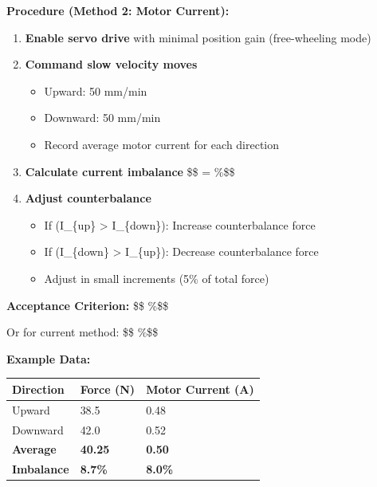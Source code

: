 \documentclass[
]{article}
\providecommand{\tightlist}{%
  \setlength{\itemsep}{0pt}\setlength{\parskip}{0pt}}
\begin{document}
\textbf{Procedure (Method 2: Motor Current):}

\begin{enumerate}
\def\labelenumi{\arabic{enumi}.}
\item
  \textbf{Enable servo drive} with minimal position gain (free-wheeling
  mode)
\item
  \textbf{Command slow velocity moves}

  \begin{itemize}
  \tightlist
  \item
    Upward: 50 mm/min
  \item
    Downward: 50 mm/min
  \item
    Record average motor current for each direction
  \end{itemize}
\item
  \textbf{Calculate current imbalance} \$\$ =
   \%\$\$
\item
  \textbf{Adjust counterbalance}

  \begin{itemize}
  \tightlist
  \item
    If (I\_\{up\} \textgreater{} I\_\{down\}): Increase counterbalance
    force
  \item
    If (I\_\{down\} \textgreater{} I\_\{up\}): Decrease counterbalance
    force
  \item
    Adjust in small increments (5\% of total force)
  \end{itemize}
\end{enumerate}

\textbf{Acceptance Criterion:}
\$\$\left\textbar{}\right\textbar{}
\%\$\$

Or for current method: \$\$
\%\$\$

\textbf{Example Data:}

{\def\LTcaptype{} %
\begin{longtable}[]{@{}lll@{}}
\toprule\noalign{}
Direction & Force (N) & Motor Current (A) \\
\midrule\noalign{}
\endhead
\bottomrule\noalign{}
\endlastfoot
Upward & 38.5 & 0.48 \\
Downward & 42.0 & 0.52 \\
\textbf{Average} & \textbf{40.25} & \textbf{0.50} \\
\textbf{Imbalance} & \textbf{8.7\%} & \textbf{8.0\%} \\
\end{longtable}
}
\end{document}
